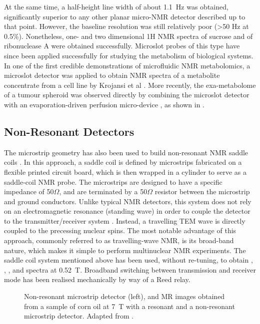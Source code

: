 		At the same time, a half-height line width of
about 1.1~Hz was obtained, significantly superior to any other planar
micro-NMR detector described up to that point. However, the baseline
resolution was still relatively poor (\textgreater{}50 Hz at 0.5\%).
Nonetheless, one- and two dimensional 1H NMR spectra of sucrose and of
ribonuclease A were obtained successfully. Microslot probes of this type
have since been applied successfully for studying the metabolism of
biological systems. In one of the first credible demonstrations of
microfluidic NMR metabolomics, a microslot detector was applied to
obtain NMR spectra of a metabolite concentrate from a cell line by
Krojansi et al \cite{krojanski2008mnp}. More recently, the exa-metabolome
of a tumour spheroid was observed directly by combining the microslot
detector with an evaporation-driven perfusion micro-device
\cite{Kalfe:2015ik}, as shown in .

\subsection{Non-Resonant Detectors}
The microstrip geometry
has also been used to build non-resonant NMR saddle coils
\cite{Murphree:2007hg}. In this approach, a saddle coil is defined by
microstrips fabricated on a flexible printed circuit board, which is
then wrapped in a cylinder to serve as a saddle-coil NMR probe. The
microstrips are designed to have a specific impedance of 50$\Omega$, and are
terminated by a 50$\Omega$ resistor between the microstrip and ground
conductors. Unlike typical NMR detectors, this system does not rely on
an electromagnetic resonance (standing wave) in order to couple the
detector to the transmitter/receiver system \cite{Mispelter:2006ty}. Instead,
a travelling TEM wave is directly coupled to the precessing nuclear
spins. The most notable advantage of this approach, commonly referred to
as travelling-wave NMR, is its broad-band nature, which makes it simple
to perform multinuclear NMR experiments. The saddle coil system
mentioned above has been used, without re-tuning, to obtain , 
,
, and  spectra at 0.52~T. 
Broadband switching between transmission
and receiver mode has been realised mechanically by way of a Reed relay.

\begin{figure}
	\begin{center}
	\end{center}
	\caption{Non-resonant microstrip detector (left), and MR images obtained
		from a sample of corn oil at 7~T with a resonant and a non-resonant
		microstrip detector. Adapted from \cite{Zhang:2008uh}.}
	\label{fig-Zhang-2008uh}
\end{figure}

